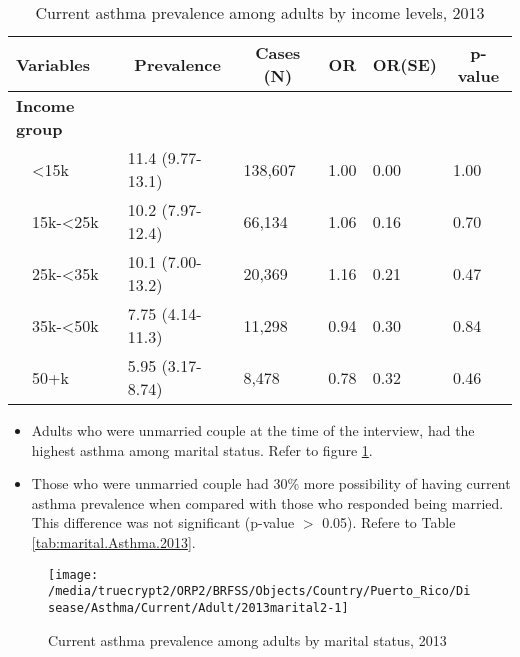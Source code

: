 \begin{table}[H]
\caption{Current asthma prevalence  among adults by income levels, 2013\label{tab:income.Asthma.2013}} 
\begin{center}
\begin{tabular}{llllll}
\hline\hline
\multicolumn{1}{l}{Variables}&\multicolumn{1}{c}{Prevalence}&\multicolumn{1}{c}{Cases (N)}&\multicolumn{1}{c}{OR}&\multicolumn{1}{c}{OR(SE)}&\multicolumn{1}{c}{p-value}\tabularnewline
\hline
{\bfseries Income group}&&&&&\tabularnewline
~~\textless15k&11.4 (9.77-13.1)&138,607&1.00&0.00&1.00\tabularnewline
~~15k-\textless25k&10.2 (7.97-12.4)& 66,134&1.06&0.16&0.70\tabularnewline
~~25k-\textless35k&10.1 (7.00-13.2)& 20,369&1.16&0.21&0.47\tabularnewline
~~35k-\textless50k&7.75 (4.14-11.3)& 11,298&0.94&0.30&0.84\tabularnewline
~~50+k&5.95 (3.17-8.74)&  8,478&0.78&0.32&0.46\tabularnewline
\hline
\end{tabular}\end{center}

\end{table}

 \newpage
\begin{itemize}

\item Adults who were 
unmarried couple at the time of the interview, had the highest asthma among marital status. Refer to figure \ref{fig:marital.Asthma.2013}.

\item Those who were unmarried couple had 30\% more possibility of having current asthma prevalence when compared with those who responded being married. This difference was not significant (p-value $>$ 0.05). Refere to Table \ref{tab:marital.Asthma.2013}.

\end{itemize}

\begin{figure}[H]
\caption{Current asthma prevalence among adults by marital status,
         2013}
\label{fig:marital.Asthma.2013}
\begin{knitrout}
\color{fgcolor}

{\centering \texttt{[image: /media/truecrypt2/ORP2/BRFSS/Objects/Country/Puerto\_Rico/Disease/Asthma/Current/Adult/2013marital2-1]} 

}



\end{knitrout}
 \end{figure}

